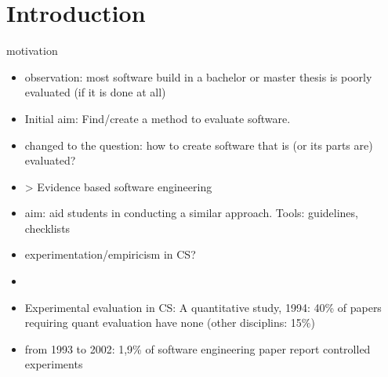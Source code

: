 \section{Introduction}

motivation

\begin{itemize}
\item observation: most software build in a bachelor or master thesis is poorly evaluated (if it is done at all)
\item Initial aim: Find/create a method to evaluate software.
\item changed to the question: how to create software that is (or its parts are) evaluated?
\item > Evidence based software engineering 
\item aim: aid students in conducting a similar approach. Tools: guidelines, checklists
\end{itemize}

\begin{itemize}
\item experimentation/empiricism in CS?
\item {}
\item Experimental evaluation in CS: A quantitative study, 1994: 40\% of papers requiring quant evaluation have none (other disciplins: 15\%)
\item {} from 1993 to 2002: 1,9\% of software engineering paper report controlled experiments
\end{itemize}